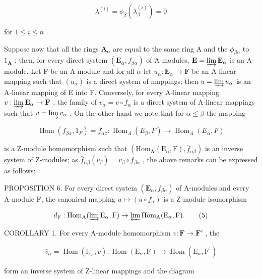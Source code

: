 \[
\lambda^ {(i)} = \phi_ {\beta} (\lambda_ {\beta} ^ {(i)}) = 0
\]

for \(1 \leqslant i \leqslant n\) .

Suppose now that all the rings \(\mathbf{A}_{\alpha}\) are equal to the same ring A and the \(\phi_{\beta \alpha}\) to \(1_{\mathbf{A}}\) ; then, for every direct system \((\mathbf{E}_{\alpha}, f_{\beta \alpha})\) of A-modules, \(\mathbf{E} = \varinjlim \mathbf{E}_{\alpha}\) is an A-module. Let F be an A-module and for all \(\alpha\) let \(u_{\alpha}: \mathbf{E}_{\alpha} \to \mathbf{F}\) be an A-linear mapping such that \((u_{\alpha})\) is a direct system of mappings; then \(u = \varinjlim u_{\alpha}\) is an A-linear mapping of E into F. Conversely, for every A-linear mapping \(v: \varinjlim \mathbf{E}_{\alpha} \to \mathbf{F}\) , the family of \(v_{\alpha} = v \circ f_{\alpha}\) is a direct system of A-linear mappings such that \(v = \varinjlim v_{\alpha}\) . On the other hand we note that for \(\alpha \leqslant \beta\) the mapping

\[
\operatorname{Hom} (f _ {\beta \alpha}, 1 _ {F}) = \bar {f} _ {\alpha \beta}: \operatorname{Hom} _ {A} (E _ {\beta}, F) \rightarrow \operatorname{Hom} _ {A} (E _ {\alpha}, F)
\]

is a Z-module homomorphism such that \((\mathrm{Hom}_{\mathbf{A}}(\mathrm{E}_{\alpha},\mathrm{F}),\bar{f}_{\alpha\beta})\) is an inverse system of Z-modules; as \(\bar{f}_{\alpha\beta}(v_{\beta}) = v_{\beta} \circ f_{\beta\alpha}\) , the above remarks can be expressed as follows:

PROPOSITION 6. For every direct system \((\mathbf{E}_{\alpha}, f_{\beta \alpha})\) of A-modules and every A-module F, the canonical mapping \(u \mapsto (u \circ f_{\alpha})\) is a Z-module isomorphism

\[
d _ {\mathrm{F}}: \operatorname{Hom} _ {\mathrm{A}} (\varinjlim \mathrm{E} _ {\alpha}, \mathrm{F}) \rightarrow \varprojlim \operatorname{Hom} _ {\mathrm{A}} (\mathrm{E} _ {\alpha}, \mathrm{F}).\tag{5}
\]

COROLLARY 1. For every A-module homomorphism \(v: \mathbf{F} \to \mathbf{F}'\) , the

\[
\bar {v} _ {\alpha} = \operatorname{Hom} \left(\mathrm{l} _ {\mathrm{E} _ {\alpha}}, v\right): \operatorname{Hom} \left(\mathrm{E} _ {\alpha}, \mathrm{F}\right)\rightarrow \operatorname{Hom} \left(\mathrm{E} _ {\alpha}, \mathrm{F} ^ {\prime}\right)
\]

form an inverse system of Z-linear mappings and the diagram

